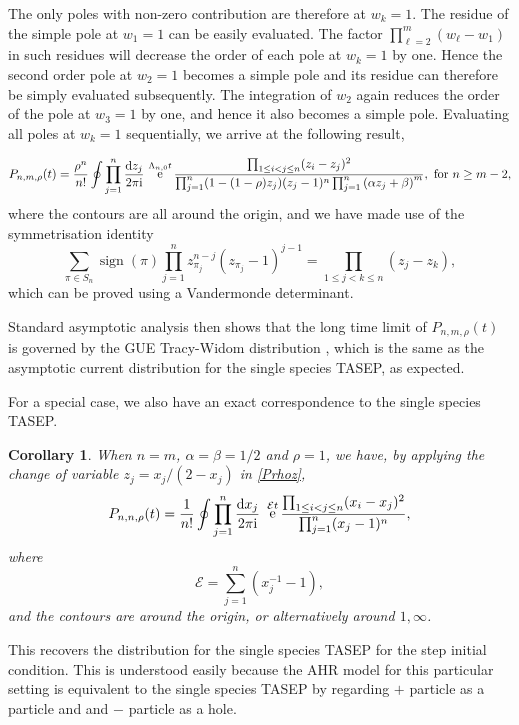 \documentclass[cmp]{svjour}
\numberwithin{theorem}{section}
\numberwithin{equation}{section}
\DeclareMathOperator{\e}{e}
\def\dd{{\rm d}}
\def\ii{{\rm i}}
\DeclareMathOperator{\sign}{sign}
\newtheorem{corollaryn}[theorem]{Corollary}
\begin{document}
The only poles with non-zero contribution are therefore at $w_k=1$. The residue of the simple pole at $w_1=1$ can be easily evaluated. The factor $\prod_{\ell =2}^m (w_\ell -w_1)$ in such residues will decrease the order of each pole at $w_k=1$ by one. Hence the second order pole at $w_2=1$ becomes a simple pole and its residue can therefore be simply evaluated subsequently. The integration of $w_2$ again reduces the order of the pole at $w_3=1$ by one, and hence it also becomes a simple pole. Evaluating all poles at $w_k=1$ sequentially, we arrive at the following result,

\begin{equation}
P_{n,m,\rho}(t)
=
\frac{\rho^n}{n!}\oint \prod_{j=1}^n \frac{\dd z_j }{2\pi \ii}\,
\e^{\Lambda_{n,0} t} \frac{\prod_{1\le i<j\le n} (z_i-z_j)^2 }
{\prod_{j=1}^n (1-(1-\rho) z_j)(z_j-1)^{n}
\prod_{j=1}^n \left(\alpha z_j + \beta \right)^m}, \ \mathrm{for} \ n \geq m-2 ,
\label{Prhoz}
\end{equation}
where the contours are all around the origin, and we have made use of the symmetrisation identity
\begin{equation*}
\sum_{\pi\in S_n} \sign(\pi) \prod_{j=1}^n z_{\pi_j}^{n-j} (z_{\pi_j}-1)^{j-1}
=
\prod_{1 \leq j<k \leq n} (z_j-z_k) ,
\end{equation*}
which can be proved using a Vandermonde determinant.

Standard asymptotic analysis \cite{J2000,BFPS2007} then shows that the long time limit of $P_{n,m,\rho}(t)$ is governed by the GUE Tracy-Widom distribution \cite{TW1994,Mehta2004random,forrester2010random}, which is the same as the asymptotic current distribution for the single species TASEP, as expected.

For a special case, we also 
have an exact correspondence to the single species TASEP. 

\medskip
\begin{corollaryn}
When $n=m$, $\alpha=\beta=1/2$ and $\rho=1$, we have, by applying the change of variable $z_j = x_j/(2-x_j)$ in \eqref{Prhoz},
\begin{align}
P_{n,n,\rho}(t)
=
\frac{1}{n!}\oint \prod_{j=1}^n \frac{\dd x_j }{2\pi \ii}\ \e^{\mathcal{E} t}
\frac{\prod_{1\le i<j\le n} (x_i-x_j)^2 } {\prod_{j=1}^n (x_j-1)^{n}} ,
\label{SymTASEP}
\end{align}
where
$$
\mathcal{E}=\sum_{j=1}^n (x_j^{-1}-1),
$$
and the contours are around the origin, or alternatively around $1,\infty$. 
\end{corollaryn}
\medskip
This recovers the distribution for the single species TASEP for the step initial condition. 
This is understood easily because the AHR model for this particular setting is 
equivalent to the single species TASEP by regarding $+$ particle as a particle and and 
$-$ particle as a hole. 
\end{document}
